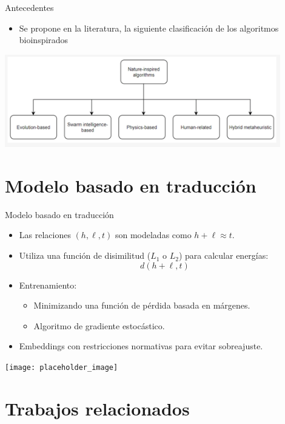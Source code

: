 \documentclass{beamer}
\begin{document}
\begin{frame}{Antecedentes}
    \begin{itemize}
        \item Se propone en la literatura, la siguiente clasificación de los algoritmos bioinspirados  
    \end{itemize}

    \vspace{0.5cm}
    \centering
    \includegraphics[width=0.9\textwidth]{classification_2.png}

\end{frame}

\section{Modelo basado en traducción}

\begin{frame}{Modelo basado en traducción}
    \begin{itemize}
        \item Las relaciones $(h, \ell, t)$ son modeladas como $h + \ell \approx t$.
        \item Utiliza una función de disimilitud ($L_1$ o $L_2$) para calcular energías:
        \[
        d(h + \ell, t)
        \]
        \item Entrenamiento:
        \begin{itemize}
            \item Minimizando una función de pérdida basada en márgenes.
            \item Algoritmo de gradiente estocástico.
        \end{itemize}
        \item Embeddings con restricciones normativas para evitar sobreajuste.
    \end{itemize}
    \vspace{0.5cm}
    \centering
    \texttt{[image: placeholder\_image]} %
\end{frame}


\section{Trabajos relacionados}
\end{document}
